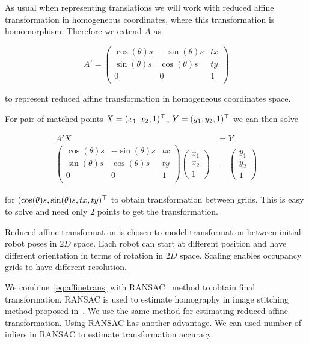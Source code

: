 As usual when representing translations we will work with reduced affine transformation in homogeneous coordinates, where this transformation is homomorphism. Therefore we extend $A$ as

\begin{equation}
    A' =
    \begin{pmatrix}
        \cos(\theta)s & -\sin(\theta)s & tx \\
        \sin(\theta)s & \cos(\theta)s & ty \\
        0 & 0 & 1 \\
    \end{pmatrix}
\end{equation}

to represent reduced affine transformation in homogeneous coordinates space.

For pair of matched points $X=(x_1,x_2,1)^\top$, $Y=(y_1, y_2, 1)^\top$ we can then solve

\begin{align}
    A'X &= Y \label{eq:affinetrans}\\
    \begin{pmatrix}
        \cos(\theta)s & -\sin(\theta)s & tx \\
        \sin(\theta)s & \cos(\theta)s & ty \\
        0 & 0 & 1 \\
    \end{pmatrix}
    \begin{pmatrix}
        x_1 \\
        x_2 \\
        1
    \end{pmatrix}
    &=
    \begin{pmatrix}
        y_1 \\
        y_2 \\
        1
    \end{pmatrix}
\end{align}

for $(\cos(\theta)s, \sin(\theta)s, tx, ty)^\top$ to obtain transformation between grids. This is easy to solve and need only $2$ points to get the transformation.

Reduced affine transformation is chosen to model transformation between initial robot poses in $2D$ space. Each robot can start at different position and have different orientation in terms of rotation in $2D$ space. Scaling enables occupancy grids to have different resolution.

We combine~\eqref{eq:affinetrans} with \gls{RANSAC}~\cite{fischler1981random} method to obtain final transformation. \gls{RANSAC} is used to estimate homography in image stitching method proposed in~\cite{Brown2006}. We use the same method for estimating reduced affine transformation. Using \gls{RANSAC} has another advantage. We can used number of inliers in \gls{RANSAC} to estimate transformation accuracy.


